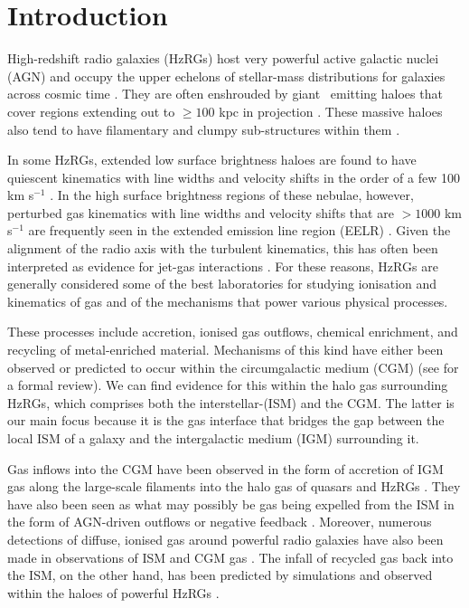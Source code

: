 \section{Introduction}

High-redshift radio galaxies (HzRGs) host very powerful active galactic nuclei (AGN) and occupy the upper echelons of stellar-mass distributions for galaxies across cosmic time \citep{jarvis2001,debreuck2002a,rocca-volmerange2004,seymour2007}. They are often enshrouded by giant \lya~emitting haloes that cover regions extending out to $\geq 100$ kpc in projection \citep[e.g.][]{baum1988,heckman1991,vanbreugel2006,mccarthy1990b,vanojik1996}. These massive haloes also tend to have filamentary and clumpy sub-structures within them \citep{reuland2003}. 

In some HzRGs, extended low surface brightness haloes are found to have quiescent kinematics with line widths and velocity shifts in the order of a few 100 km s$^{-1}$ \citep{villar-martin2003}. In the high surface brightness regions of these nebulae, however, perturbed gas kinematics with line widths and velocity shifts that are $> 1000$ km s$^{-1}$ are frequently seen in the extended emission line region (EELR) \citep[e.g.][]{mccarthy1996,rottgering1997,villar-martin1999a}. Given the alignment of the radio axis with the turbulent kinematics, this has often been interpreted as evidence for jet-gas interactions \citep[e.g.][]{humphrey2006,morais2017,nesvadba2017a,nesvadba2017b}. For these reasons, HzRGs are generally considered some of the best laboratories for studying ionisation and kinematics of gas and of the mechanisms that power various physical processes. 

These processes include accretion, ionised gas outflows, chemical enrichment, and recycling of metal-enriched material. Mechanisms of this kind have either been observed or predicted to occur within the circumgalactic medium (CGM) (see \citet{tumlinson2017} for a formal review). We can find evidence for this within the halo gas surrounding HzRGs, which comprises both the interstellar-(ISM) and the CGM. The latter is our main focus because it is the gas interface that bridges the gap between the local ISM of a galaxy and the intergalactic medium (IGM) surrounding it.

Gas inflows into the CGM have been observed in the form of accretion of IGM gas along the large-scale filaments into the halo gas of quasars and HzRGs \citep[e.g.][]{vernet2017,arrigoni-battaia2018}. They have also been seen as what may possibly be gas being expelled from the ISM in the form of AGN-driven outflows or negative feedback \citep[e.g.][]{holt2008,reuland2007,nesvadba2008,bischetti2017}. Moreover, numerous detections of diffuse, ionised gas around powerful radio galaxies have also been made in observations of ISM and CGM gas \citep[e.g.][\citealp{Gullberg2016a} is G16 from hereon]{tadhunter1989,mccarthy1990a,pentericci1999}. The infall of recycled gas back into the ISM, on the other hand, has been predicted by simulations \citep[e.g.][]{oppenheimer2008,oppenheimer2010,oppenheimer2018} and observed within the haloes of powerful HzRGs \citep[e.g.,][]{humphrey2007,emonts2018}. 


